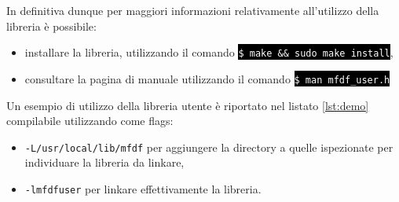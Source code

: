 \documentclass{article}
\newcommand{\terminal}[1]{\colorbox{black}{\textcolor{white}{\texttt{#1}}}}
\begin{document}
In definitiva dunque per maggiori informazioni relativamente all'utilizzo della libreria è possibile:
\begin{itemize}
        \item installare la libreria, utilizzando il comando \terminal{\$ make \&\& sudo make install},
        \item consultare la pagina di manuale utilizzando il comando \terminal{\$ man mfdf\_user.h}
\end{itemize}

Un esempio di utilizzo della libreria utente è riportato nel listato \ref{lst:demo} compilabile utilizzando come flags:
\begin{itemize}
        \item \texttt{-L/usr/local/lib/mfdf} per aggiungere la directory a quelle ispezionate per individuare la libreria da linkare,
        \item \texttt{-lmfdfuser} per linkare effettivamente la libreria.
\end{itemize}


\end{document}

